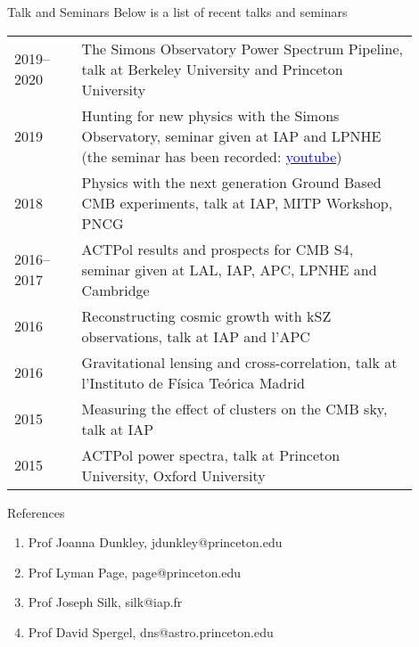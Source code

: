 \documentclass{resume} %
\newcommand{\TIB}[1]{\textcolor{blue}{#1}}
\begin{document}
\begin{rSection}{Talk and Seminars }
Below is a list of recent talks and seminars 
\begin{table}[h]
{\def\arraystretch{1.5}\tabcolsep=0pt
\begin{tabular}{p{0.15\linewidth}p{0.75\linewidth}}
2019--2020 & The Simons Observatory Power Spectrum Pipeline, talk at Berkeley University and Princeton University \\
2019 & Hunting for new physics with the Simons Observatory, seminar given at  IAP and  LPNHE (the seminar has been recorded: \href{https://www.youtube.com/watch?v=1XnZhEU1WgE}{\TIB{youtube}})  \\
2018 & Physics with the next generation Ground Based CMB experiments, talk at IAP, MITP Workshop, PNCG \\
2016--2017 & ACTPol results and prospects for CMB S4, seminar given at LAL, IAP, APC,  LPNHE and Cambridge\\
2016 & Reconstructing cosmic growth with kSZ observations, talk at IAP and l'APC \\
2016 & Gravitational lensing and cross-correlation, talk at l'Instituto de Física Teórica Madrid \\
2015 & Measuring the effect of clusters on the CMB sky, talk at IAP \\
2015 & ACTPol power spectra, talk at Princeton University, Oxford University
\vspace{0.5cm}
\end{tabular}%
}
\end{table}
\vspace{-0.6cm}
\end{rSection}


\begin{rSection}{References }

\begin{enumerate}
\item Prof Joanna Dunkley, jdunkley@princeton.edu
\item Prof Lyman Page, page@princeton.edu
\item Prof Joseph Silk, silk@iap.fr
\item Prof David Spergel, dns@astro.princeton.edu
\end{enumerate}

\end{rSection}
\end{document}
